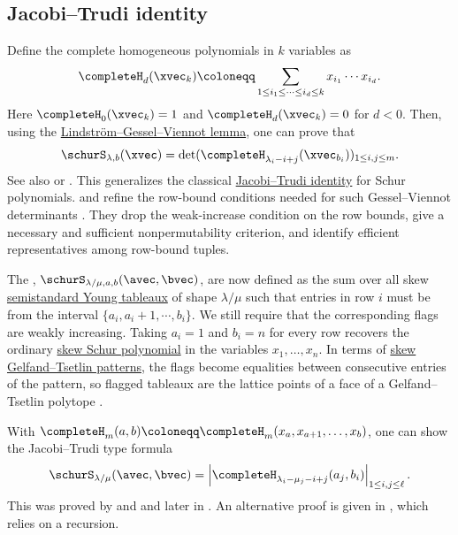 \subsection[flaggedSchurPolynomialJacobiTrudi]{Jacobi--Trudi identity}

Define the complete homogeneous polynomials in $k$ variables as
\[
\completeH_d(\xvec_k) \coloneqq
\sum_{1 \leq i_1 \leq \dotsb \leq i_d \leq k} x_{i_1}\dotsm x_{i_d}.
\]
Here $\completeH_0(\xvec_k)=1$ and $\completeH_d(\xvec_k)=0$ for $d<0$.
Then, using the \hyperref[lgvLemma]{Lindström--Gessel--Viennot lemma},
one can prove that
\[
\schurS_{\lambda,b}(\xvec) = \det(  \completeH_{\lambda_i -i+j}(\xvec_{b_i}) )_{1\leq i,j \leq m}.
\]
See also \cite{Wachs1985} or \cite[Cor.~2.6.3]{Manivel2001}.
This generalizes the classical \hyperref[schurJacobiTrudi]{Jacobi--Trudi identity}
for Schur polynomials.
 and  refine the row-bound
conditions needed for such Gessel--Viennot determinants
\cite{ProctorWillis2021}.  They drop the weak-increase condition on the row
bounds, give a necessary and sufficient nonpermutability criterion, and
identify efficient representatives among row-bound tuples.


The 
\label{flaggedSkewSchurPolynomialDefinition},
$\schurS_{\lambda/\mu,a,b}(\avec,\bvec)$, are now defined as the sum over all
skew \hyperref[prelimTableaux]{semistandard Young tableaux} of shape
$\lambda/\mu$ such that entries in row $i$ must be from the interval
$\{a_i,a_i+1,\dotsb,b_i\}$.
We still require that the corresponding flags are weakly increasing.
Taking \(a_i=1\) and \(b_i=n\) for every row recovers the ordinary
\hyperref[schurSkew]{skew Schur polynomial} in the variables
\(x_1,\dotsc,x_n\).
In terms of \hyperref[skewFlaggedGTPatterns]{skew Gelfand--Tsetlin patterns},
the flags become equalities between consecutive entries of the pattern, so
flagged tableaux are the lattice points of a face of a Gelfand--Tsetlin
polytope \cite[Lem.~25]{AlexanderssonOguz2023x}.

With $\completeH_m(a,b) \coloneqq  \completeH_m(x_a,x_{a+1},\dotsc,x_b)$,
one can show the Jacobi--Trudi type formula
\begin{equation}
 \schurS_{\lambda/\mu}(\avec,\bvec) =
 \left|
   \completeH_{\lambda_i-\mu_j - i + j}(a_j,b_i)
 \right|_{1 \leq i,j \leq \ell}.
\end{equation}
This was proved by  and 
\cite{GesselViennot1989} and later in \cite{Wachs1985}.
An alternative proof is given in \cite{Chu1992}, which relies on a recursion.

